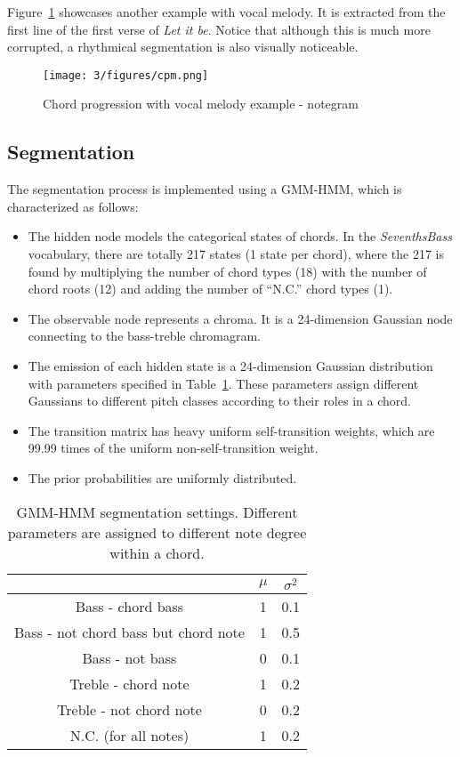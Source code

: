 Figure~\ref{fig:3-cpm} showcases another example with vocal melody. It is extracted from the first line of the first verse of {\it Let it be}. Notice that although this is much more corrupted, a rhythmical segmentation is also visually noticeable.
\begin{figure}
\centering
\texttt{[image: 3/figures/cpm.png]}
\caption{Chord progression with vocal melody example - notegram}
\label{fig:3-cpm}
\end{figure}

\newpage
\subsection{Segmentation} \label{sec:3-sg}
The segmentation process is implemented using a GMM-HMM, which is characterized as follows:
\begin{itemize}
	\item The hidden node models the categorical states of chords. In the \textit{SeventhsBass} vocabulary, there are totally 217 states (1 state per chord), where the 217 is found by multiplying the number of chord types (18) with the number of chord roots (12) and adding the number of ``N.C.'' chord types (1).
	
	\item The observable node represents a chroma. It is a 24-dimension Gaussian node connecting to the bass-treble chromagram.
	
	\item The emission of each hidden state is a 24-dimension Gaussian distribution with parameters specified in Table~\ref{tab:3-gaussian}. These parameters assign different Gaussians to different pitch classes according to their roles in a chord.
	
	\item The transition matrix has heavy uniform self-transition weights, which are 99.99 times of the uniform non-self-transition weight.
	
	\item The prior probabilities are uniformly distributed.
\end{itemize}

\begin{table}
\caption{GMM-HMM segmentation settings. Different parameters are assigned to different note degree within a chord.}
\centering
\footnotesize
\begin{tabular}{|c|c|c|} \hline
      & $\mu$ & $\sigma^2$ \\ \hline
 Bass - chord bass & 1 & 0.1 \\ \hline
 Bass - not chord bass but chord note & 1 & 0.5  \\ \hline
 Bass - not bass & 0 & 0.1 \\ \hline
 Treble - chord note & 1 & 0.2  \\ \hline
 Treble - not chord note & 0 & 0.2 \\ \hline
 N.C. (for all notes)  & 1 & 0.2  \\ \hline
\end{tabular}
\label{tab:3-gaussian}
\end{table}

